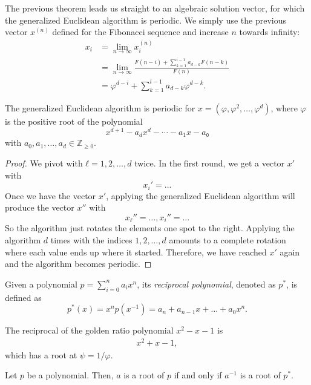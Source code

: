 The previous theorem leads us straight to an algebraic solution vector,
for which the generalized Euclidean algorithm is periodic.
We simply use the previous vector $x^{(n)}$ defined for the Fibonacci sequence
and increase $n$ towards infinity:
\begin{align*}
  x_i
  & = \lim_{n → ∞} x_i^{(n)} \\
  & = \lim_{n → ∞} \frac{F(n - i) + \sum_{k=1}^{i-1} a_{d-k} F(n - k)}{F(n)} \\
  & = φ^{d-i} + \sum_{k=1}^{i-1} a_{d-k} φ^{d-k}.
\end{align*}

\begin{theorem}
  The generalized Euclidean algorithm is periodic for $x = (φ, φ^2, …, φ^d)$,
  where $φ$ is the positive root of the polynomial
  \[
    x^{d+1} - a_{d} x^d - ⋯ - a_1 x - a₀
  \]
  with $a_0, a_1, …, a_d ∈ ℤ_{≥ 0}$.
\end{theorem}

\begin{proof}
  We pivot with $ℓ = 1, 2, …, d$ twice.
  In the first round, we get a vector $x'$ with
  \[
    x_i' = ...
  \]
  Once we have the vector $x'$, applying the generalized Euclidean algorithm
  will produce the vector $x''$ with
  \[
    x_ℓ'' = …, x_i'' = …
  \]
  So the algorithm just rotates the elements one spot to the right.
  Applying the algorithm $d$ times with the indices $1, 2, …, d$
  amounts to a complete rotation where each value ends up where it started.
  Therefore, we have reached $x'$ again and the algorithm becomes periodic.
\end{proof}

\iffalse
\begin{definition}
  Given a polynomial $p = \sum_{i=0}^n a_i x^n$, its \emph{reciprocal polynomial},
  denoted as $p^*$, is defined as
  \[
    p^*(x) = x^n p(x^{-1}) = a_n + a_{n-1} x + \dots + a_0 x^n.
  \]
\end{definition}

\begin{example}
  The reciprocal of the golden ratio polynomial $x^2 - x - 1$ is
  \begin{align*}
    x^2 + x - 1,
  \end{align*}
  which has a root at $ψ = 1/φ$.
\end{example}

\begin{lemma}
  Let $p$ be a polynomial. Then, $a$ is a root of $p$ if and only if $a^{-1}$ is a root of $p^*$.
\end{lemma}

